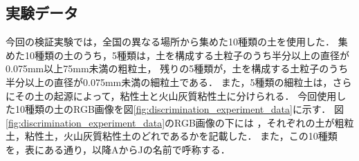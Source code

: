\clearpage

\subsection{実験データ}
\label{ssec:DiscriminationExperimentalProcedure}

今回の検証実験では，全国の異なる場所から集めた10種類の土を使用した．
集めた10種類の土のうち，5種類は，土を構成する土粒子のうち半分以上の直径が0.075mm以上75mm未満の粗粒土，
残りの5種類が，土を構成する土粒子のうち半分以上の直径が0.075mm未満の細粒土である．
また，5種類の細粒土は，さらにその土の起源によって，粘性土と火山灰質粘性土に分けられる．
今回使用した10種類の土のRGB画像を図\ref{fig:discrimination_experiment_data}に示す．
図\ref{fig:discrimination_experiment_data}のRGB画像の下には
，それぞれの土が粗粒土，粘性土，火山灰質粘性土のどれであるかを記載した．
また，この10種類を，表にある通り，以降AからJの名前で呼称する．

